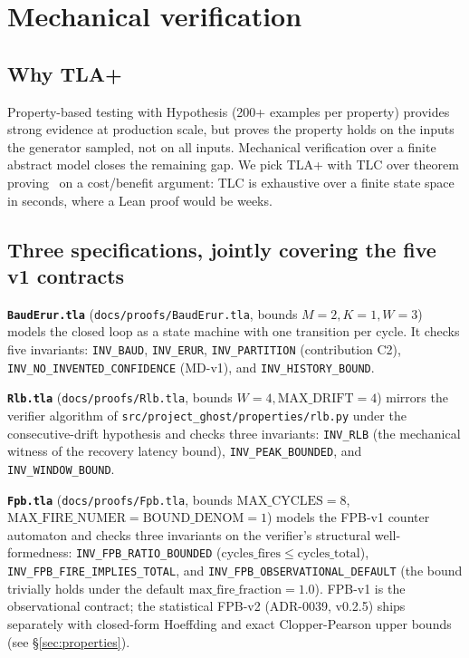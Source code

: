 \documentclass[11pt,a4paper]{article}
\begin{document}
\section{Mechanical verification}
\label{sec:mechanical}

\subsection{Why TLA+}
Property-based testing with Hypothesis (200+ examples per property)
provides strong evidence at production scale, but proves the property
holds on the inputs the generator sampled, not on all inputs.
Mechanical verification over a finite abstract model closes the
remaining gap. We pick TLA+ with TLC over theorem
proving~\cite{lamport2002specifying} on a cost/benefit argument: TLC
is exhaustive over a finite state space in seconds, where a Lean
proof would be weeks.

\subsection{Three specifications, jointly covering the five v1 contracts}
\textbf{\texttt{BaudErur.tla}} (\texttt{docs/proofs/BaudErur.tla},
bounds $M{=}2, K{=}1, W{=}3$) models the closed loop as a state
machine with one transition per cycle. It checks five invariants:
\texttt{INV\_BAUD}, \texttt{INV\_ERUR}, \texttt{INV\_PARTITION}
(contribution C2), \texttt{INV\_NO\_INVENTED\_CONFIDENCE} (MD-v1),
and \texttt{INV\_HISTORY\_BOUND}.

\textbf{\texttt{Rlb.tla}} (\texttt{docs/proofs/Rlb.tla}, bounds
$W{=}4, \mathrm{MAX\_DRIFT}{=}4$) mirrors the verifier algorithm of
\texttt{src/project\_ghost/properties/rlb.py} under the
consecutive-drift hypothesis and checks three invariants:
\texttt{INV\_RLB} (the mechanical witness of the recovery latency bound),
\texttt{INV\_PEAK\_BOUNDED}, and \texttt{INV\_WINDOW\_BOUND}.

\textbf{\texttt{Fpb.tla}} (\texttt{docs/proofs/Fpb.tla}, bounds
$\mathrm{MAX\_CYCLES}{=}8$, $\mathrm{MAX\_FIRE\_NUMER}{=}\mathrm{BOUND\_DENOM}{=}1$)
models the FPB-v1 counter automaton and checks three invariants on
the verifier's structural well-formedness:
\texttt{INV\_FPB\_RATIO\_BOUNDED}
($\mathrm{cycles\_fires} \le \mathrm{cycles\_total}$),
\texttt{INV\_FPB\_FIRE\_IMPLIES\_TOTAL}, and
\texttt{INV\_FPB\_OBSERVATIONAL\_DEFAULT} (the bound trivially holds
under the default $\mathrm{max\_fire\_fraction} = 1.0$). FPB-v1 is
the observational contract; the statistical FPB-v2 (ADR-0039,
v0.2.5) ships separately with closed-form Hoeffding and exact
Clopper-Pearson upper bounds (see \S\ref{sec:properties}).
\end{document}
